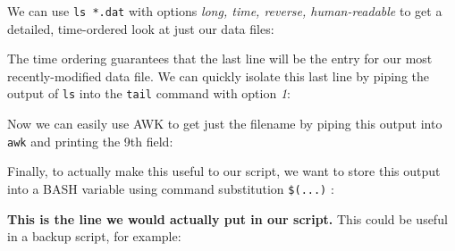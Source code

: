 \documentclass[10pt,a4]{article}
\begin{document}
We can use \texttt{ls *.dat} with options \textit{long, time, reverse, human-readable} to get a detailed, time-ordered look at just our data files:

\ttfamily
\colorbox{black}{}

\colorbox{black}{}
\normalfont

The time ordering guarantees that the last line will be the entry for our most recently-modified data file.
We can quickly isolate this last line by piping the output of \texttt{ls} into the \texttt{tail} command with option \textit{1}:

\ttfamily
\colorbox{black}{}

\colorbox{black}{\color{white}{
-rw-rw-r-- 1 user user 273M Jul\ \ 1 14:23 run3.dat
}}
\normalfont

Now we can easily use AWK to get just the filename by piping this output into \texttt{awk} and printing the 9th field:

\ttfamily
\colorbox{black}{}

\colorbox{black}{\color{white}{
run3.dat
}}
\normalfont

Finally, to actually make this useful to our script, we want to store this output into a BASH variable using command substitution \texttt{\$(...)} :

\ttfamily
\colorbox{black}{}
\normalfont

\textbf{This is the line we would actually put in our script.} This could be useful in a backup script, for example:

\ttfamily
\colorbox{black}{}
\end{document}

